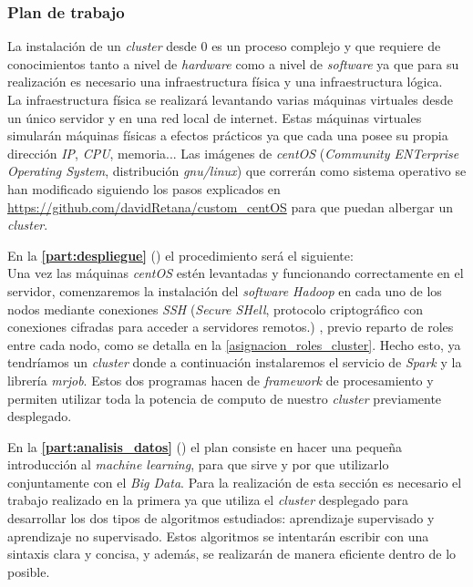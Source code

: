 \subsubsection*{Plan de trabajo}
La instalación de un \textit{cluster} desde 0 es un proceso complejo y que requiere de conocimientos tanto a nivel de 
\textit{hardware} como a nivel de \textit{software} ya que para su realización es necesario una infraestructura física 
y una infraestructura lógica.\\
La infraestructura física se realizará levantando varias máquinas virtuales desde un único servidor y en una red local
de internet. Estas máquinas virtuales simularán máquinas físicas a efectos prácticos ya que cada una posee su propia
dirección \textit{IP}, \textit{CPU}, memoria...
Las imágenes de \textit{centOS} (\textit{Community ENTerprise Operating System}, distribución \textit{gnu/linux}) 
que correrán como sistema operativo se han modificado siguiendo los pasos explicados
en \url{https://github.com/davidRetana/custom_centOS} para que puedan albergar un \textit{cluster}.
\newline

\noindent En la \textbf{\autoref{part:despliegue}} () el procedimiento será el siguiente:\\
Una vez las máquinas \textit{centOS} estén levantadas y funcionando correctamente en el servidor, comenzaremos la
instalación del \textit{software Hadoop} en cada uno de los nodos mediante conexiones \textit{SSH} 
(\textit{Secure SHell}, protocolo criptográfico con conexiones cifradas para acceder a servidores remotos.)
, previo reparto de roles entre cada nodo, como se detalla en la \autoref{asignacion_roles_cluster}.
Hecho esto, ya tendríamos un \textit{cluster} donde a continuación instalaremos el servicio de \textit{Spark} y la 
librería \textit{mrjob}. Estos dos programas hacen de \textit{framework} de procesamiento y permiten utilizar
toda la potencia de computo de nuestro \textit{cluster} previamente desplegado.
\newline

\noindent En la \textbf{\autoref{part:analisis_datos}} () el plan consiste en hacer
una pequeña introducción al \textit{machine learning}, para que sirve y por que utilizarlo conjuntamente con el 
\textit{Big Data}. Para la realización de esta sección es necesario el trabajo realizado en la primera 
ya que utiliza el \textit{cluster} desplegado para desarrollar los dos tipos de algoritmos estudiados: 
aprendizaje supervisado y aprendizaje no supervisado. Estos algoritmos se intentarán escribir con una sintaxis 
clara y concisa, y además, se realizarán de manera eficiente dentro de lo posible.


